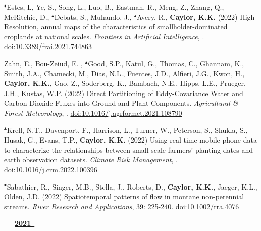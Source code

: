 \begin{etaremune}
\item $^{\blacklozenge}$Estes, L, Ye, S., Song, L., Luo, B., Eastman, R., Meng, Z., Zhang, Q., McRitchie, D., $^{\blacktriangle}$Debats, S., Muhando, J., $^{\blacktriangle}$Avery, R., \textbf{ Caylor, K.K.} (2022) High Resolution, annual maps of the characteristics of smallholder-dominated croplands at national scales. \emph{Frontiers in Artificial Intelligence}, . \href{https://doi.org/10.3389/frai.2021.744863}{doi:10.3389/frai.2021.744863}
\item Zahn, E., Bou-Zeiud, E. , $^{\blacktriangle}$Good, S.P., Katul, G., Thomas, C., Ghannam, K., Smith, J.A., Chamecki, M., Dias, N.L., Fuentes, J.D., Alfieri, J.G., Kwon, H., \textbf{ Caylor, K.K.}, Gao, Z., Soderberg, K., Bambach, N.E., Hipps, L.E., Prueger, J.H., Kustas, W.P. (2022) Direct Partitioning of Eddy-Covariance Water and Carbon Dioxide Fluxes into Ground and Plant Components. \emph{Agricultural \& Forest Meteorology}, . \href{https://doi.org/10.1016/j.agrformet.2021.108790}{doi:10.1016/j.agrformet.2021.108790}
\item $^{\blacktriangle}$Krell, N.T., Davenport, F., Harrison, L., Turner, W., Peterson, S., Shukla, S., Husak, G., Evans, T.P., \textbf{ Caylor, K.K.} (2022) Using real-time mobile phone data to characterize the relationships between small-scale farmers' planting dates and earth observation datasets. \emph{Climate Risk Management}, . \href{https://doi.org/10.1016/j.crm.2022.100396}{doi:10.1016/j.crm.2022.100396}
\item $^{\bullet}$Sabathier, R., Singer, M.B., Stella, J., Roberts, D., \textbf{ Caylor, K.K.}, Jaeger, K.L., Olden, J.D. (2022) Spatiotemporal patterns of flow in montane non-perennial streams. \emph{River Research and Applications}, 39: 225-240. \href{https://doi.org/10.1002/rra.4076}{doi:10.1002/rra.4076}

\vspace{0.1in}
\mbox{\ \ \ \underline{\textbf{2021 }}}
\vspace{0.1in}


\end{etaremune}

